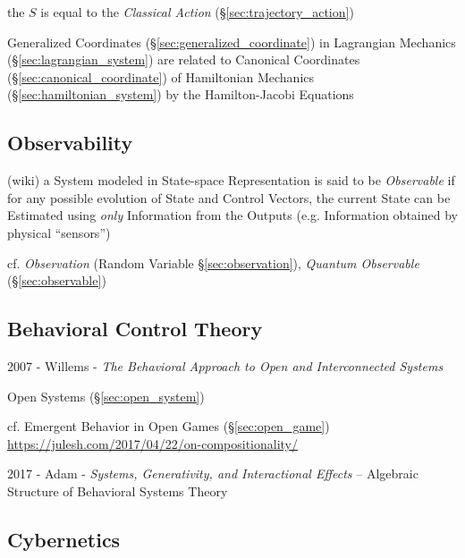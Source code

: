 the $S$ is equal to the \emph{Classical Action} (\S\ref{sec:trajectory_action})

Generalized Coordinates (\S\ref{sec:generalized_coordinate}) in Lagrangian
Mechanics (\S\ref{sec:lagrangian_system}) are related to Canonical Coordinates
(\S\ref{sec:canonical_coordinate}) of Hamiltonian Mechanics
(\S\ref{sec:hamiltonian_system}) by the Hamilton-Jacobi Equations



\subsection{Observability}\label{sec:observability}

(wiki) a System modeled in State-space Representation is said to be
\emph{Observable} if for any possible evolution of State and Control Vectors,
the current State can be Estimated using \emph{only} Information from the
Outputs (e.g. Information obtained by physical ``sensors'')

cf. \emph{Observation} (Random Variable \S\ref{sec:observation}),
\emph{Quantum Observable} (\S\ref{sec:observable})



\subsection{Behavioral Control Theory}\label{sec:behavioral_control}

2007 - Willems - \emph{The Behavioral Approach to Open and Interconnected
  Systems}

\fist Open Systems (\S\ref{sec:open_system})

\fist cf. Emergent Behavior in Open Games (\S\ref{sec:open_game})
\url{https://julesh.com/2017/04/22/on-compositionality/}

2017 - Adam - \emph{Systems, Generativity, and Interactional Effects}
-- Algebraic Structure of Behavioral Systems Theory



\subsection{Cybernetics}\label{sec:cybernetics}

